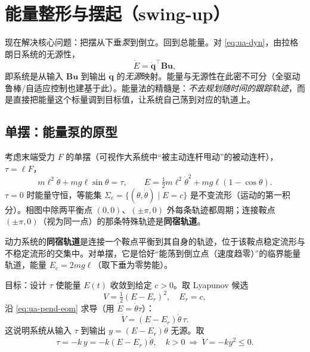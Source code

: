 \section{能量整形与摆起（swing-up）}\label{sec:ua-energy}

现在解决核心问题：把摆从下垂\emph{泵}到倒立。回到总能量。对 \cref{eq:ua-dyn}，由拉格朗日系统的无源性，
\begin{equation}\label{eq:ua-passivity}
  \dot{E}=\dot{\mathbf{q}}^\top\mathbf{B}\mathbf{u},
\end{equation}
即系统是从输入 $\mathbf{B}\mathbf{u}$ 到输出 $\dot{\mathbf{q}}$ 的\emph{无源}映射。能量与无源性在此密不可分（全驱动鲁棒/自适应控制也建基于此）。能量法的精髓是：\emph{不去规划随时间的跟踪轨迹}，而是直接把能量这个标量调到目标值，让系统自己荡到对应的轨道上。

\subsection{单摆：能量泵的原型}\label{sec:ua-pendulum-pump}

考虑末端受力 $F$ 的单摆（可视作大系统中“被主动连杆甩动”的被动连杆），$\tau=\ell F$，
\begin{equation}\label{eq:ua-pend-eom}
  m\ell^2\ddot{\theta}+mg\ell\sin\theta=\tau,\qquad E=\tfrac12 m\ell^2\dot{\theta}^2+mg\ell(1-\cos\theta).
\end{equation}
$\tau=0$ 时能量守恒，等能集 $\Sigma_c=\{(\theta,\dot{\theta})\mid E=c\}$ 是不变流形（运动的第一积分）。相图中除两平衡点 $(0,0)$、$(\pm\pi,0)$ 外每条轨迹都周期；连接鞍点 $(\pm\pi,0)$（视为同一点）的那条特殊轨迹是\textbf{同宿轨道}。

\begin{definition}[同宿轨道]\label{def:ua-homoclinic}
动力系统的\textbf{同宿轨道}是连接一个鞍点平衡到其自身的轨迹，位于该鞍点稳定流形与不稳定流形的交集中。对单摆，它是恰好“能荡到倒立点（速度趋零）”的临界能量轨道，能量 $E_c=2mg\ell$（取下垂为零势能）。
\end{definition}

目标：设计 $\tau$ 使能量 $E(t)$ 收敛到给定 $c>0$。取 Lyapunov 候选
\begin{equation}\label{eq:ua-V-pend}
  V=\tfrac12(E-E_r)^2,\quad E_r=c,
\end{equation}
沿 \cref{eq:ua-pend-eom} 求导（用 $\dot{E}=\dot{\theta}\tau$）：
\begin{equation}\label{eq:ua-Vdot-pend}
  \dot{V}=(E-E_r)\dot{\theta}\,\tau.
\end{equation}
这说明系统从输入 $\tau$ 到输出 $y=(E-E_r)\dot{\theta}$ 无源。取
\begin{equation}\label{eq:ua-pump-law}
  \tau=-k\,y=-k(E-E_r)\dot{\theta},\quad k>0\ \Longrightarrow\ \dot{V}=-ky^2\le0.
\end{equation}

